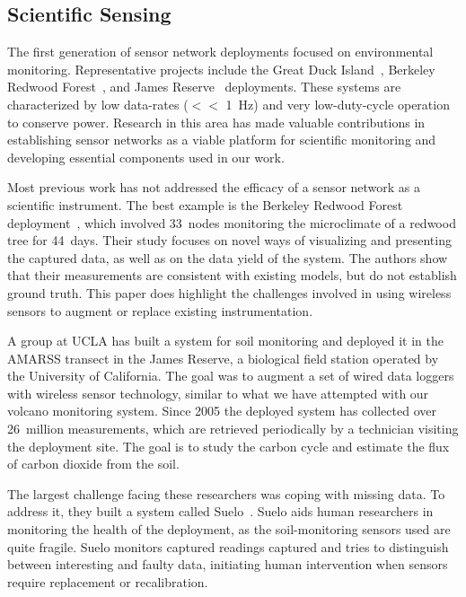 \subsection{Scientific Sensing}

The first generation of sensor network deployments focused on environmental
monitoring. Representative projects include the Great Duck
Island~\cite{spm:04habitat,polastre-masters,mainwaring-habitat}, Berkeley
Redwood Forest~\cite{berkeley-redwoods}, and James
Reserve~\cite{cerpa-habitat} deployments. These systems are characterized by
low data-rates ($<<$ 1~Hz) and very low-duty-cycle operation to conserve
power. Research in this area has made valuable contributions in establishing
sensor networks as a viable platform for scientific monitoring and developing
essential components used in our work. 

Most previous work has not addressed the efficacy of a sensor network as a
scientific instrument. The best example is the Berkeley Redwood Forest
deployment~\cite{berkeley-redwoods}, which involved 33~nodes monitoring the
microclimate of a redwood tree for 44~days. Their study focuses on novel ways
of visualizing and presenting the captured data, as well as on the data yield
of the system. The authors show that their measurements are consistent with
existing models, but do not establish ground truth. This paper does highlight
the challenges involved in using wireless sensors to augment or replace
existing instrumentation.

A group at UCLA has built a system for soil monitoring and deployed it in the
AMARSS transect in the James Reserve, a biological field station operated by
the University of California. The goal was to augment a set of wired data
loggers with wireless sensor technology, similar to what we have attempted
with our volcano monitoring system. Since 2005 the deployed system has
collected over 26~million measurements, which are retrieved periodically by a
technician visiting the deployment site. The goal is to study the carbon
cycle and estimate the flux of carbon dioxide from the soil.

The largest challenge facing these researchers was coping with missing data.
To address it, they built a system called Suelo~\cite{suelo-sensys09}. Suelo
aids human researchers in monitoring the health of the deployment, as the
soil-monitoring sensors used are quite fragile. Suelo monitors captured
readings captured and tries to distinguish between interesting and faulty
data, initiating human intervention when sensors require replacement or
recalibration.

